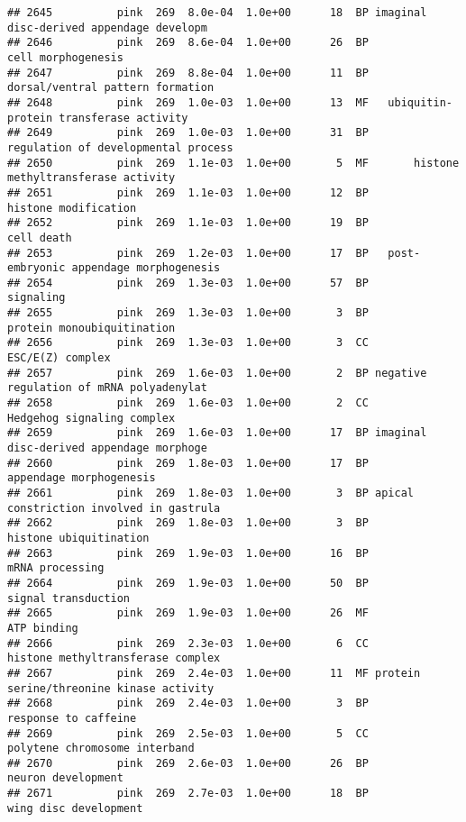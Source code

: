 \documentclass[]{article}
\begin{document}
\begin{verbatim}
## 2645          pink  269  8.0e-04  1.0e+00      18  BP imaginal disc-derived appendage developm
## 2646          pink  269  8.6e-04  1.0e+00      26  BP                       cell morphogenesis
## 2647          pink  269  8.8e-04  1.0e+00      11  BP         dorsal/ventral pattern formation
## 2648          pink  269  1.0e-03  1.0e+00      13  MF   ubiquitin-protein transferase activity
## 2649          pink  269  1.0e-03  1.0e+00      31  BP      regulation of developmental process
## 2650          pink  269  1.1e-03  1.0e+00       5  MF       histone methyltransferase activity
## 2651          pink  269  1.1e-03  1.0e+00      12  BP                     histone modification
## 2652          pink  269  1.1e-03  1.0e+00      19  BP                               cell death
## 2653          pink  269  1.2e-03  1.0e+00      17  BP   post-embryonic appendage morphogenesis
## 2654          pink  269  1.3e-03  1.0e+00      57  BP                                signaling
## 2655          pink  269  1.3e-03  1.0e+00       3  BP               protein monoubiquitination
## 2656          pink  269  1.3e-03  1.0e+00       3  CC                         ESC/E(Z) complex
## 2657          pink  269  1.6e-03  1.0e+00       2  BP negative regulation of mRNA polyadenylat
## 2658          pink  269  1.6e-03  1.0e+00       2  CC               Hedgehog signaling complex
## 2659          pink  269  1.6e-03  1.0e+00      17  BP imaginal disc-derived appendage morphoge
## 2660          pink  269  1.8e-03  1.0e+00      17  BP                  appendage morphogenesis
## 2661          pink  269  1.8e-03  1.0e+00       3  BP apical constriction involved in gastrula
## 2662          pink  269  1.8e-03  1.0e+00       3  BP                   histone ubiquitination
## 2663          pink  269  1.9e-03  1.0e+00      16  BP                          mRNA processing
## 2664          pink  269  1.9e-03  1.0e+00      50  BP                      signal transduction
## 2665          pink  269  1.9e-03  1.0e+00      26  MF                              ATP binding
## 2666          pink  269  2.3e-03  1.0e+00       6  CC        histone methyltransferase complex
## 2667          pink  269  2.4e-03  1.0e+00      11  MF protein serine/threonine kinase activity
## 2668          pink  269  2.4e-03  1.0e+00       3  BP                     response to caffeine
## 2669          pink  269  2.5e-03  1.0e+00       5  CC            polytene chromosome interband
## 2670          pink  269  2.6e-03  1.0e+00      26  BP                       neuron development
## 2671          pink  269  2.7e-03  1.0e+00      18  BP                    wing disc development

\end{verbatim}
\end{document}
